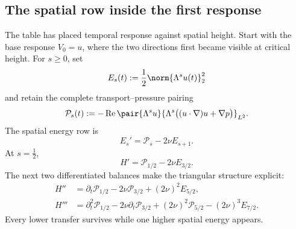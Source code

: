 \subsection{The spatial row inside the first response}\label{sub:TheViscosityDrivenSpatialAscent}

The table has placed temporal response against spatial height.  Start with the
base response \(V_0=u\), where the two directions first became visible at
critical height.  For \(s\geq0\), set
\[
  E_s(t):=\frac12\norm{\Lambda^su(t)}_2^2
\]
and retain the complete transport--pressure pairing
\[
  \mathcal P_s(t)
  :=-
  \operatorname{Re}
  \pair{\Lambda^su}
  {\Lambda^s\bigl((u\cdot\nabla)u+\nabla p\bigr)}_{L^2}.
\]
The spatial energy row is
\begin{equation}\label{eq:BodyFullSpatialEnergyBalance}
  E_s'=\mathcal P_s-2\nu E_{s+1}.
\end{equation}
At \(s=\tfrac12\),
\begin{equation}\label{eq:BodyFirstCriticalRow}
  H'=\mathcal P_{1/2}-2\nu E_{3/2}.
\end{equation}
The next two differentiated balances make the triangular structure explicit:
\begin{align}
  H''
  &=\partial_t\mathcal P_{1/2}
  -2\nu\mathcal P_{3/2}
  +(2\nu)^2E_{5/2},
  \label{eq:BodySecondCriticalRow}\\
  H'''
  &=\partial_t^2\mathcal P_{1/2}
  -2\nu\partial_t\mathcal P_{3/2}
  +(2\nu)^2\mathcal P_{5/2}
  -(2\nu)^3E_{7/2}.
  \label{eq:BodyThirdCriticalRow}
\end{align}
Every lower transfer survives while one higher spatial energy appears.

